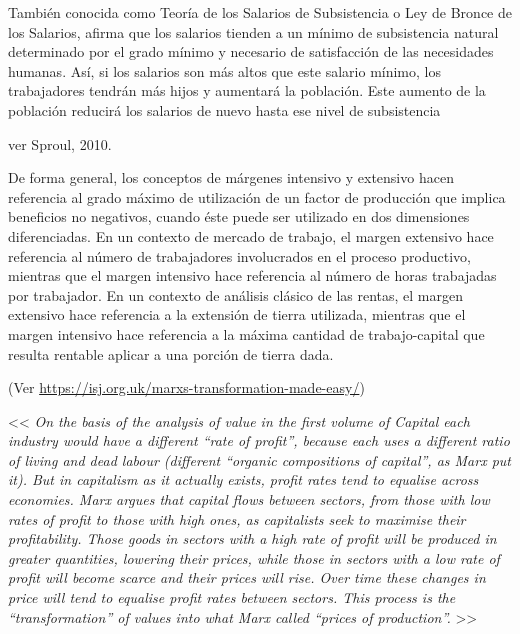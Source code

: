 \documentclass{nuevotema}
\begin{document}
\conceptos


También conocida como Teoría de los Salarios de Subsistencia o Ley de Bronce de los Salarios, afirma que los salarios tienden a un mínimo de subsistencia natural determinado por el grado mínimo y necesario de satisfacción de las necesidades humanas. Así, si los salarios son más altos que este salario mínimo, los trabajadores tendrán más hijos y aumentará la población. Este aumento de la población reducirá los salarios de nuevo hasta ese nivel de subsistencia


ver Sproul, 2010.


De forma general, los conceptos de márgenes intensivo y extensivo hacen referencia al grado máximo de utilización de un factor de producción que implica beneficios no negativos, cuando éste puede ser utilizado en dos dimensiones diferenciadas. En un contexto de mercado de trabajo, el margen extensivo hace referencia al número de trabajadores involucrados en el proceso productivo, mientras que el margen intensivo hace referencia al número de horas trabajadas por trabajador. En un contexto de análisis clásico de las rentas, el margen extensivo hace referencia a la extensión de tierra utilizada, mientras que el margen intensivo hace referencia a la máxima cantidad de trabajo-capital que resulta rentable aplicar a una porción de tierra dada.


(Ver \url{https://isj.org.uk/marxs-transformation-made-easy/})

<< \textit{On the basis of the analysis of value in the first volume of Capital each industry would have a different “rate of profit”, because each uses a different ratio of living and dead labour (different “organic compositions of capital”, as Marx put it). But in capitalism as it actually exists, profit rates tend to equalise across economies. Marx argues that capital flows between sectors, from those with low rates of profit to those with high ones, as capitalists seek to maximise their profitability. Those goods in sectors with a high rate of profit will be produced in greater quantities, lowering their prices, while those in sectors with a low rate of profit will become scarce and their prices will rise. Over time these changes in price will tend to equalise profit rates between sectors. This process is the “transformation” of values into what Marx called “prices of production”.} >> 
\end{document}
